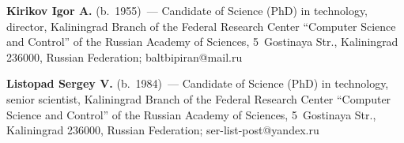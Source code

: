 
   
   \Contr
   
   \noindent
   \textbf{Kirikov Igor A.} (b.\ 1955)~--- Candidate of  Science (PhD) in technology, director, 
Kaliningrad Branch of the Federal Research Center ``Computer Science and Control'' of the Russian 
Academy of Sciences, 5~Gostinaya Str., Kaliningrad 236000, Russian Federation; 
\mbox{baltbipiran@mail.ru}
   
   \vspace*{3pt}
   
   \noindent
   \textbf{Listopad Sergey V.} (b.\ 1984)~--- Candidate of Science (PhD) in technology, senior scientist, 
Kaliningrad Branch of the Federal Research Center ``Computer Science and Control'' of the Russian 
Academy of Sciences, 5~Gostinaya Str., Kaliningrad 236000, Russian Federation;  
\mbox{ser-list-post@yandex.ru}
   
    
\label{end\stat}

\renewcommand{\bibname}{\protect\rm Литература}